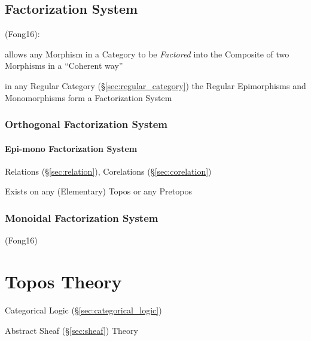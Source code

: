 \subsection{Factorization System}\label{sec:factorization_system}

(Fong16):

allows any Morphism in a Category to be \emph{Factored} into the
Composite of two Morphisms in a ``Coherent way'' %

in any Regular Category (\S\ref{sec:regular_category}) the Regular
Epimorphisms and Monomorphisms form a Factorization System



\subsubsection{Orthogonal Factorization System}
\label{sec:orthogonal_factorization_system}

\paragraph{Epi-mono Factorization System}
\label{sec:epimono_factorization}\hfill

Relations (\S\ref{sec:relation}), Corelations (\S\ref{sec:corelation})

Exists on any (Elementary) Topos or any Pretopos %



\subsubsection{Monoidal Factorization System}
\label{sec:monoidal_factorization_system}

(Fong16)



\section{Topos Theory}\label{sec:topos_theory}

Categorical Logic (\S\ref{sec:categorical_logic})

Abstract Sheaf (\S\ref{sec:sheaf}) Theory

